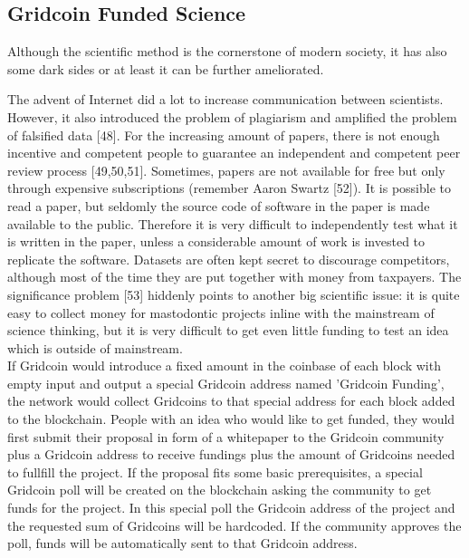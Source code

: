 \subsection{Gridcoin Funded Science}

Although the scientific method is the cornerstone of modern society, it has also some dark sides or at least it can be further ameliorated. 

The advent of Internet did a lot to increase communication between scientists. However, it also introduced the problem of plagiarism and amplified the problem of falsified data [48]. For the increasing amount of papers, there is not enough incentive and competent people to guarantee an independent and competent peer review process [49,50,51]. Sometimes, papers are not available for free but only through expensive subscriptions (remember Aaron Swartz [52]). It is possible to read a paper, but seldomly the source code of software in the paper is made available to the public. Therefore it is very difficult to independently test what it is written in the paper, unless a considerable amount of work is invested to replicate the software. Datasets are often kept secret to discourage competitors, although most of the time they are put together with money from taxpayers. The significance problem [53] hiddenly points to another big scientific issue: it is quite easy to collect money for mastodontic projects inline with the mainstream of science thinking, but it is very difficult to get even little funding to test an idea which is outside of mainstream.\\

If Gridcoin would introduce a fixed amount in the coinbase of each block with empty input and output a special Gridcoin address named 'Gridcoin Funding', the network would collect Gridcoins to that special address for each block added to the blockchain. People with an idea who would like to get funded, they would first submit their proposal in form of a whitepaper to the Gridcoin community plus a Gridcoin address to receive fundings plus the amount of Gridcoins needed to fullfill the project. If the proposal fits some basic prerequisites, a special Gridcoin poll will be created on the blockchain asking the community to get funds for the project. In this special poll the Gridcoin address of the project and the requested sum of Gridcoins will be hardcoded. If the community approves the poll, funds will be automatically sent to that Gridcoin address.\\


